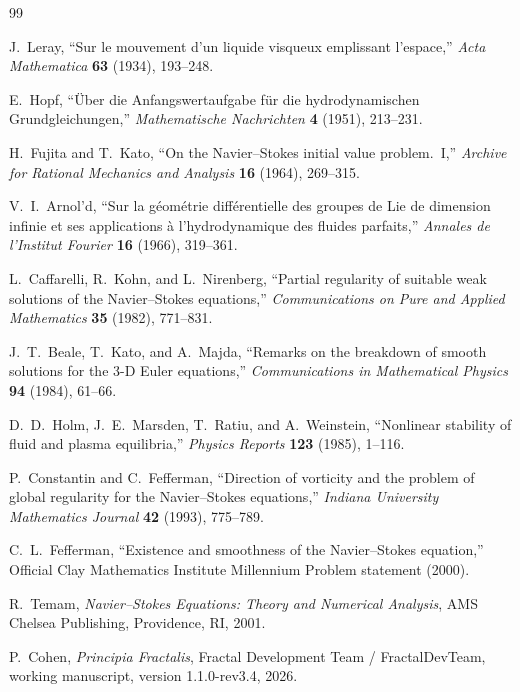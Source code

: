 \documentclass[11pt,a4paper]{article}
\theoremstyle{plain}
\theoremstyle{definition}
\begin{document}
\begin{thebibliography}{99}

 J.~Leray, ``Sur le mouvement d'un liquide
visqueux emplissant l'espace,''
\emph{Acta Mathematica} \textbf{63} (1934), 193--248.

 E.~Hopf, ``\"{U}ber die Anfangswertaufgabe f\"{u}r
die hydrodynamischen Grundgleichungen,''
\emph{Mathematische Nachrichten} \textbf{4} (1951), 213--231.

 H.~Fujita and T.~Kato, ``On the
Navier--Stokes initial value problem.~I,''
\emph{Archive for Rational Mechanics and Analysis} \textbf{16}
(1964), 269--315.

 V.~I.~Arnol'd, ``Sur la g\'{e}om\'{e}trie
diff\'{e}rentielle des groupes de Lie de dimension infinie et ses
applications \`{a} l'hydrodynamique des fluides parfaits,''
\emph{Annales de l'Institut Fourier} \textbf{16} (1966), 319--361.

 L.~Caffarelli, R.~Kohn, and
L.~Nirenberg, ``Partial regularity of suitable weak solutions of the
Navier--Stokes equations,'' \emph{Communications on Pure and Applied
Mathematics} \textbf{35} (1982), 771--831.

 J.~T.~Beale, T.~Kato, and A.~Majda, ``Remarks on
the breakdown of smooth solutions for the 3-D Euler equations,''
\emph{Communications in Mathematical Physics} \textbf{94} (1984),
61--66.

 D.~D.~Holm, J.~E.~Marsden, T.~Ratiu, and
A.~Weinstein, ``Nonlinear stability of fluid and plasma equilibria,''
\emph{Physics Reports} \textbf{123} (1985), 1--116.

 P.~Constantin and C.~Fefferman,
``Direction of vorticity and the problem of global regularity for the
Navier--Stokes equations,'' \emph{Indiana University Mathematics
Journal} \textbf{42} (1993), 775--789.

 C.~L.~Fefferman, ``Existence and smoothness
of the Navier--Stokes equation,'' Official Clay Mathematics Institute
Millennium Problem statement (2000).

 R.~Temam, \emph{Navier--Stokes Equations: Theory
and Numerical Analysis}, AMS Chelsea Publishing, Providence, RI,
2001.

 P.~Cohen, \emph{Principia Fractalis},
Fractal Development Team / FractalDevTeam, working manuscript,
version 1.1.0-rev3.4, 2026.

\end{thebibliography}
\end{document}
